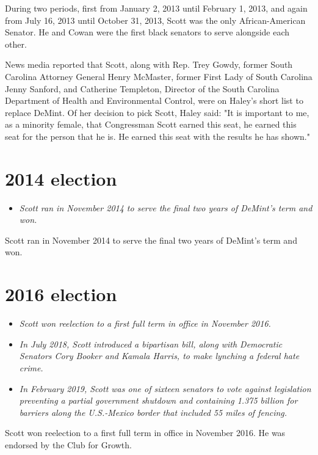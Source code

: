 During two periods, first from January 2, 2013 until February 1, 2013,
and again from July 16, 2013 until October 31, 2013, Scott was the only
African-American Senator. He and Cowan were the first black senators to
serve alongside each other.

News media reported that Scott, along with Rep. Trey Gowdy, former South
Carolina Attorney General Henry McMaster, former First Lady of South
Carolina Jenny Sanford, and Catherine Templeton, Director of the South
Carolina Department of Health and Environmental Control, were on Haley's
short list to replace DeMint. Of her decision to pick Scott, Haley said:
"It is important to me, as a minority female, that Congressman Scott
earned this seat, he earned this seat for the person that he is. He
earned this seat with the results he has shown."

\section{2014 election}\label{election}

\begin{itemize}
\item
  \emph{Scott ran in November 2014 to serve the final two years of
  DeMint's term and won.}
\end{itemize}

Scott ran in November 2014 to serve the final two years of DeMint's term
and won.

\section{2016 election}\label{election-1}

\begin{itemize}
\item
  \emph{Scott won reelection to a first full term in office in November
  2016.}
\item
  \emph{In July 2018, Scott introduced a bipartisan bill, along with
  Democratic Senators Cory Booker and Kamala Harris, to make lynching a
  federal hate crime.}
\item
  \emph{In February 2019, Scott was one of sixteen senators to vote
  against legislation preventing a partial government shutdown and
  containing 1.375 billion for barriers along the U.S.-Mexico border
  that included 55 miles of fencing.}
\end{itemize}

Scott won reelection to a first full term in office in November 2016. He
was endorsed by the Club for Growth.

